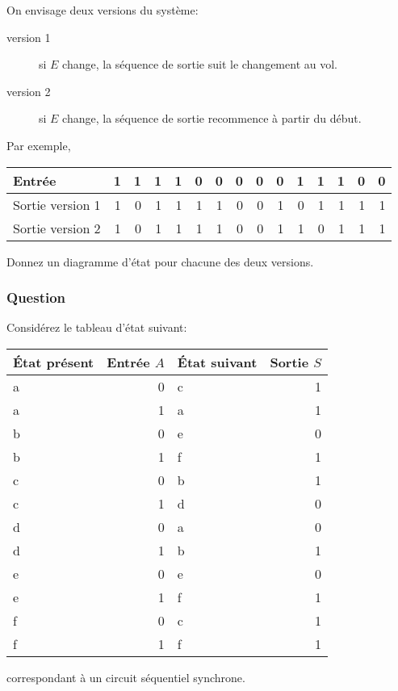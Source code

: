 \documentclass[11pt]{article}
\begin{document}
On envisage deux versions du système:

\begin{description}
\item[{version 1}] si  \(E\) change, la séquence de sortie suit le
changement au vol.

\item[{version 2}] si \(E\) change, la séquence de sortie recommence à
partir du début.
\end{description}

Par exemple,
\begin{center}
\begin{tabular}{lrrrrrrrrrrrrrr}
Entrée & 1 & 1 & 1 & 1 & 0 & 0 & 0 & 0 & 0 & 1 & 1 & 1 & 0 & 0\\[0pt]
\hline
Sortie version 1 & 1 & 0 & 1 & 1 & 1 & 1 & 0 & 0 & 1 & 0 & 1 & 1 & 1 & 1\\[0pt]
Sortie version 2 & 1 & 0 & 1 & 1 & 1 & 1 & 0 & 0 & 1 & 1 & 0 & 1 & 1 & 1\\[0pt]
\end{tabular}
\end{center}

Donnez un diagramme d'état pour chacune des deux versions.

\subsubsection*{Question}
\label{sec:orge447fd4}
Considérez le tableau d'état suivant:
\begin{center}
\begin{tabular}{lrlr}
État présent & Entrée \(A\) & État suivant & Sortie \(S\)\\[0pt]
\hline
a & 0 & c & 1\\[0pt]
a & 1 & a & 1\\[0pt]
b & 0 & e & 0\\[0pt]
b & 1 & f & 1\\[0pt]
c & 0 & b & 1\\[0pt]
c & 1 & d & 0\\[0pt]
d & 0 & a & 0\\[0pt]
d & 1 & b & 1\\[0pt]
e & 0 & e & 0\\[0pt]
e & 1 & f & 1\\[0pt]
f & 0 & c & 1\\[0pt]
f & 1 & f & 1\\[0pt]
\end{tabular}
\end{center}
correspondant à un circuit séquentiel synchrone.
\end{document}
